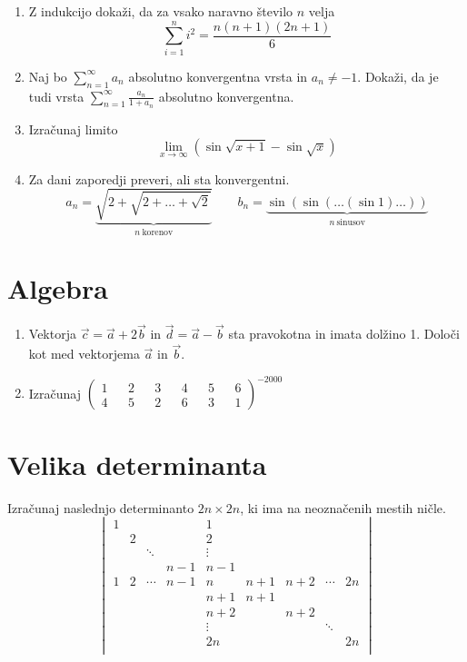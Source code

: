 \documentclass[a4paper,12pt]{article}
\begin{document}
\begin{enumerate}
\item
Z indukcijo dokaži, da za vsako naravno število \(n\) velja
\[
\sum_{i=1}^{n}i^2=\frac{n(n+1)(2n+1)}{6}
\]

\item
Naj bo \(\sum_{n=1}^{\infty}a_n\) absolutno konvergentna vrsta in \(a_n \ne -1\).
Dokaži, da je tudi vrsta \(\sum_{n=1}^\infty \frac{a_n}{1+a_n}\)
absolutno konvergentna.

\item
Izračunaj limito
\[
\lim_{x \to \infty}(\sin \sqrt{x+1}-\sin \sqrt{x})
\]

\item
Za dani zaporedji preveri, ali sta konvergentni.
\[
a_n = \underbrace{\sqrt{2+\sqrt{2+\dots+\sqrt{2}}}}_{n~\text{korenov}} \qquad
b_n = \underbrace{\sin(\sin(\dots(\sin 1)\dots))}_{n~\text{sinusov}}
\]
\end{enumerate}

\section*{Algebra}

\begin{enumerate}
\item
Vektorja \(\vec{c}=\vec{a}+2\vec{b}\) in \(\vec{d}=\vec{a}-\vec{b}\)
sta pravokotna in imata dolžino 1. Določi kot med vektorjema \(\vec{a}\) in \(\vec{b}\).

\item
Izračunaj
\(
\left(
\begin{aligned}
1 && 2 && 3 && 4 && 5 && 6 \\
4 && 5 && 2 && 6 && 3 && 1
\end{aligned}
\right)^{-2000}
\)
\end{enumerate}

\section*{Velika determinanta}

Izračunaj naslednjo determinanto \(2n \times 2n\), ki ima na neoznačenih mestih ničle.
\[
\begin{vmatrix}
1 &&&& 1 &&&& \\
& 2 &&& 2 &&&& \\
&& \ddots && \vdots &&&& \\
&&& n-1 & n-1 &&&& \\
1 & 2 & \cdots & n-1 & n & n+1 & n+2 & \cdots & 2n \\
&&&& n+1 & n+1 &&& \\
&&&& n+2 && n+2 && \\
&&&& \vdots &&& \ddots & \\
&&&& 2n &&&& 2n \\
\end{vmatrix}
\]
\end{document}
